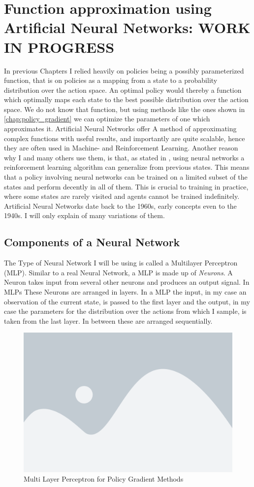 \newpage
\chapter{Function approximation using Artificial Neural Networks: WORK IN PROGRESS}\label{nn}
In previous Chapters I relied heavily on policies being a possibly parameterized function, that is on policies as a mapping from a state to a probability distribution over the action space. An optimal policy would thereby a function which optimally maps each state to the best possible distribution over the action space. We do not know that function, but using methods like the ones shown in \ref{chap:policy_gradient} we can optimize the parameters of one which approximates it. Artificial Neural Networks offer A method of approximating complex functions with useful results, and importantly are quite scalable, hence they are often used in Machine- and Reinforcement Learning. Another reason why I and many others use them, is that, as stated in , using neural networks a reinforcement learning algorithm can generalize from previous states. This means that a policy involving neural networks can be trained on a limited subset of the states and perform decently in all of them. This is crucial to training in practice, where some states are rarely visited and agents cannot be trained indefinitely. Artificial Neural Networks date back to the 1960s, early concepts even to the 1940s. I will only explain of many variations of them. 

\section{Components of a Neural Network}\label{nn:components}
The Type of Neural Network I will be using is called a Multilayer Perceptron (MLP). Similar to a real Neural Network, a MLP is made up of \textit{Neurons}. A Neuron takes input from several other neurons and produces an output signal. In MLPs These Neurons are arranged in layers. In a MLP the input, in my case an observation of the current state, is passed to the first layer and the output, in my case the parameters for the distribution over the actions from which I sample, is taken from the last layer. In between these are arranged sequentially. 

\begin{figure}[H]
    \centering
    \includegraphics[width=0.5\linewidth]{figures/placeholder.png}
    \caption{Multi Layer Perceptron for Policy Gradient Methods}
    \label{fig:my_label}
\end{figure}

